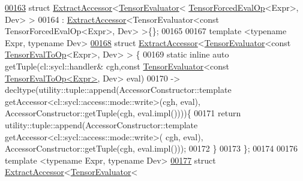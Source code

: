 \begin{DoxyCode}
\hyperlink{struct_eigen_1_1_tensor_sycl_1_1internal_1_1_extract_accessor_3_01_tensor_evaluator_3_01_tensor_4b3a89d7601e1f705c94a0624a0d4c92}{00163} \textcolor{keyword}{struct }\hyperlink{struct_eigen_1_1_tensor_sycl_1_1internal_1_1_extract_accessor}{ExtractAccessor}<\hyperlink{struct_eigen_1_1_tensor_evaluator}{TensorEvaluator}<
      \hyperlink{class_eigen_1_1_tensor_forced_eval_op}{TensorForcedEvalOp}<Expr>, Dev> >
00164 : \hyperlink{struct_eigen_1_1_tensor_sycl_1_1internal_1_1_extract_accessor}{ExtractAccessor}<TensorEvaluator<const TensorForcedEvalOp<Expr>, Dev> >\{\};
00165 
00167 \textcolor{keyword}{template} <\textcolor{keyword}{typename} Expr, \textcolor{keyword}{typename} Dev>
\hyperlink{struct_eigen_1_1_tensor_sycl_1_1internal_1_1_extract_accessor_3_01_tensor_evaluator_3_01const_0198790cf5cfaea7333b9e857f682a074d}{00168} \textcolor{keyword}{struct }\hyperlink{struct_eigen_1_1_tensor_sycl_1_1internal_1_1_extract_accessor}{ExtractAccessor}<\hyperlink{struct_eigen_1_1_tensor_evaluator}{TensorEvaluator}<const 
      \hyperlink{class_eigen_1_1_tensor_eval_to_op}{TensorEvalToOp}<Expr>, Dev> > \{
00169   \textcolor{keyword}{static} \textcolor{keyword}{inline} \textcolor{keyword}{auto} getTuple(cl::sycl::handler& cgh,\textcolor{keyword}{const} \hyperlink{struct_eigen_1_1_tensor_evaluator}{TensorEvaluator}<\textcolor{keyword}{const} 
      \hyperlink{class_eigen_1_1_tensor_eval_to_op}{TensorEvalToOp<Expr>}, Dev> eval)
00170   -> decltype(utility::tuple::append(AccessorConstructor::template 
      getAccessor<cl::sycl::access::mode::write>(cgh, eval), AccessorConstructor::getTuple(cgh, eval.impl())))\{
00171     \textcolor{keywordflow}{return} utility::tuple::append(AccessorConstructor::template getAccessor<cl::sycl::access::mode::write>(
      cgh, eval), AccessorConstructor::getTuple(cgh, eval.impl()));
00172   \}
00173 \};
00174 
00176 \textcolor{keyword}{template} <\textcolor{keyword}{typename} Expr, \textcolor{keyword}{typename} Dev>
\hyperlink{struct_eigen_1_1_tensor_sycl_1_1internal_1_1_extract_accessor_3_01_tensor_evaluator_3_01_tensor_cfda1f933d4b02ee54719f6502db4b15}{00177} \textcolor{keyword}{struct }\hyperlink{struct_eigen_1_1_tensor_sycl_1_1internal_1_1_extract_accessor}{ExtractAccessor}<\hyperlink{struct_eigen_1_1_tensor_evaluator}{TensorEvaluator}<

\end{DoxyCode}

